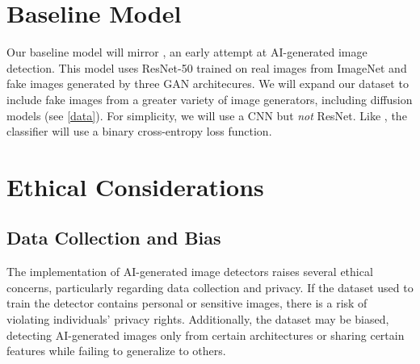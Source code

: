\documentclass{article} %
\begin{document}


\section{Baseline Model}
\label{baseline}

Our baseline model will mirror \citet{wang2020cnngeneratedimagessurprisinglyeasy}, an early attempt at AI-generated image detection. This model uses ResNet-50 trained on real images from ImageNet and fake images generated by three GAN architecures. We will expand our dataset to include fake images from a greater variety of image generators, including diffusion models (see \ref{data}). For simplicity, we will use a CNN but \textit{not} ResNet. Like \citet{wang2020cnngeneratedimagessurprisinglyeasy}, the classifier will use a binary cross-entropy loss function.

\section{Ethical Considerations}
\label{ethical}

\subsection{Data Collection and Bias}
The implementation of AI-generated image detectors raises several ethical concerns, particularly regarding data collection and privacy. If the dataset used to train the detector contains personal or sensitive images, there is a risk of violating individuals' privacy rights. Additionally, the dataset may be biased, detecting AI-generated images only from certain architectures or sharing certain features while failing to generalize to others.
\end{document}
